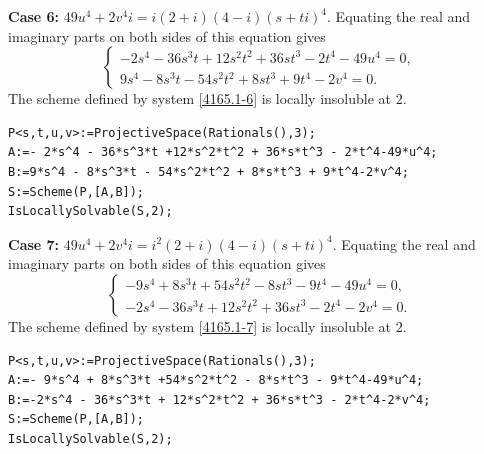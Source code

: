 \documentclass[a4paper,12pt,english,reqno]{amsart}
\begin{document}
{\bf Case 6:}  $49u^4+2v^4i=i(2+i)(4-i)(s+ti)^4$. Equating the real and imaginary parts on both sides of this equation gives
\begin{equation}\label{4165.1-6}
\begin{cases}
-2s^4 - 36s^3t + 12s^2t^2 + 36st^3 - 2t^4 - 49u^4=0,\\
9s^4 - 8s^3t - 54s^2t^2 + 8st^3 + 9t^4 - 2v^4=0.
\end{cases}
\end{equation}
The scheme defined by system \eqref{4165.1-6} is locally insoluble at $2$.

\begin{lstlisting}
P<s,t,u,v>:=ProjectiveSpace(Rationals(),3);
A:=- 2*s^4 - 36*s^3*t +12*s^2*t^2 + 36*s*t^3 - 2*t^4-49*u^4;
B:=9*s^4 - 8*s^3*t - 54*s^2*t^2 + 8*s*t^3 + 9*t^4-2*v^4;
S:=Scheme(P,[A,B]);
IsLocallySolvable(S,2);
\end{lstlisting}

{\bf Case 7:}  $49u^4+2v^4i=i^2(2+i)(4-i)(s+ti)^4$. Equating the real and imaginary parts on both sides of this equation gives
\begin{equation}\label{4165.1-7}
\begin{cases}
-9s^4 + 8s^3t + 54s^2t^2 - 8st^3 - 9t^4 - 49u^4=0,\\
-2s^4 - 36s^3t + 12s^2t^2 + 36st^3 - 2t^4 - 2v^4=0.
\end{cases}
\end{equation}
The scheme defined by system \eqref{4165.1-7} is locally insoluble at $2$.

\begin{lstlisting}
P<s,t,u,v>:=ProjectiveSpace(Rationals(),3);
A:=- 9*s^4 + 8*s^3*t +54*s^2*t^2 - 8*s*t^3 - 9*t^4-49*u^4;
B:=-2*s^4 - 36*s^3*t + 12*s^2*t^2 + 36*s*t^3 - 2*t^4-2*v^4;
S:=Scheme(P,[A,B]);
IsLocallySolvable(S,2);
\end{lstlisting}
\end{document}
